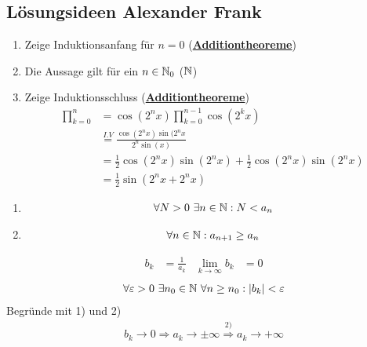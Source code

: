 \subsection{Lösungsideen Alexander Frank}
\newcommand{\additionstheoreme}{\underline{\textbf{Additiontheoreme}}}
\begin{enumerate}[label=Aufgabe \arabic*:, , leftmargin=*]
    \begin{enumerate}[label=\arabic*)]
        \item Zeige Induktionsanfang für $n = 0$ (\additionstheoreme)
        \item Die Aussage gilt für ein $n \in \mathbb N_0$ ($\mathbb N$)
        \item Zeige Induktionsschluss (\additionstheoreme)
        \begin{align*}
            \prod_{k = 0}^n &= \cos(2^n x) \prod_{k=0}^{n-1} \cos(2^k x)\\
            &\overset{I.V}{=} \frac{\cos(2^n x) \sin(2^n x}{2^n \sin(x)}\\
            &= \frac{1}{2} \cos(2^n x) \sin(2^nx) + \frac{1}{2} \cos(2^n x) \sin(2^n x)\\
            &= \frac{1}{2} \sin (2^n x + 2^n x)
        \end{align*}
    \end{enumerate}
    \begin{enumerate}[label=\arabic*)]
        \item \begin{align*}
            \forall N > 0\ \exists n \in \mathbb N : N < a_n
        \end{align*}
        \item \begin{align*}
            \forall n \in \mathbb N: a_{n+1} \geq a_n
        \end{align*}
    \end{enumerate}
    \begin{align*}
        b_k &= \frac{1}{a_k} & \lim_{k \rightarrow \infty} b_k &= 0
    \end{align*}
    \begin{align*}
        \forall \varepsilon > 0 \ \exists n_0 \in \mathbb N \ \forall n \geq n_0: |b_k| < \varepsilon
    \end{align*}
    Begründe mit 1) und 2)
    \begin{align*}
        b_k \rightarrow 0 \Rightarrow a_k \rightarrow \pm \infty \overset{2)}{\Rightarrow} a_k \rightarrow + \infty
    \end{align*}

\end{enumerate}
